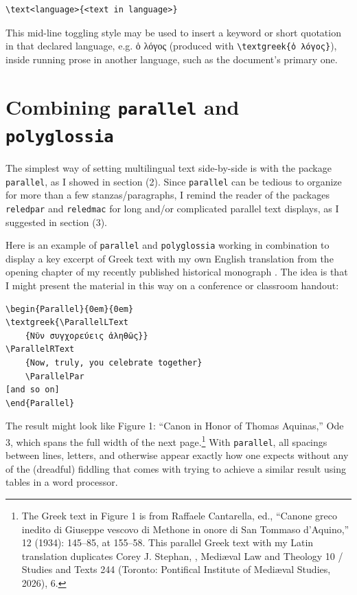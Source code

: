 \documentclass{ltugboat}
\begin{document}
\begin{verbatim}
\text<language>{<text in language>}
\end{verbatim}
%
This mid-line toggling style may be used to insert a keyword or short quotation in that declared language, e.g. {\textgreek{ὁ λόγος}} (produced with \verb|\textgreek{ὁ λόγος}|), inside running prose in another language, such as the document's primary one.

\section{Combining \texttt{parallel} and \texttt{polyglossia}}

The simplest way of setting multilingual text side-by-side is with the package \texttt{parallel}, as I showed in section (2). Since \texttt{parallel} can be tedious to organize for more than a few stanzas/paragraphs, I remind the reader of the packages \texttt{reledpar} and \texttt{reledmac} for long and/or complicated parallel text displays, as I suggested in section (3).

Here is an example of \texttt{parallel} and \texttt{polyglossia} working in combination to display a key excerpt of Greek text with my own English translation from the opening chapter of my recently published historical monograph . The idea is that I might present the material in this way on a conference or classroom handout:

\begin{verbatim}
\begin{Parallel}{0em}{0em}
\textgreek{\ParallelLText
	{Νῦν συγχορεύεις ἀληθῶς}}
\ParallelRText
	{Now, truly, you celebrate together}
	\ParallelPar
[and so on]
\end{Parallel}	
\end{verbatim}
The result might look like Figure 1: ``Canon in Honor of Thomas Aquinas,'' Ode 3, which spans the full width of the next page.\footnote{The Greek text in Figure 1 is from Raffaele Cantarella, ed., “Canone greco inedito di Giuseppe vescovo di Methone in onore di San Tommaso d’Aquino,”  12 (1934): 145--85, at 155--58. This parallel Greek text with my Latin translation duplicates Corey J. Stephan, , Medi\ae val Law and Theology 10 / Studies and Texts 244 (Toronto: Pontifical Institute of Medi\ae val Studies, 2026), 6.} With \texttt{parallel}, all spacings \Dash between lines, letters, and otherwise \Dash appear exactly how one expects without any of the (dreadful) fiddling that comes with trying to achieve a similar result using tables in a word processor.
\end{document}
